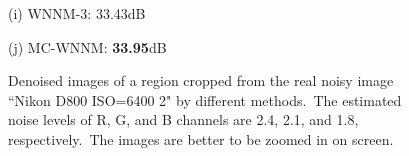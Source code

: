 \documentclass[10pt,onecolumn,letterpaper]{article}
\renewcommand{\huge}{\fontsize{8.775pt}{\baselineskip}\selectfont}
\begin{document}
\begin{figure}[!htbp]
{\begin{minipage}[t]{0.24\textwidth}
{\footnotesize (i) WNNM-3: 33.43dB}
\end{minipage}
\begin{minipage}[t]{0.24\textwidth}
\centering
{}
{\footnotesize (j) MC-WNNM: \textbf{33.95}dB}
\end{minipage}
}
\caption{Denoised images of a region cropped from the real noisy image ``Nikon D800 ISO=6400 2" \cite{crosschannel2016} by different methods.\ The estimated noise levels of R, G, and B channels are 2.4, 2.1, and 1.8, respectively.\ The images are better to be zoomed in on screen.}
\label{f14}
\end{figure}



\clearpage
{
\huge


}
\end{document}
